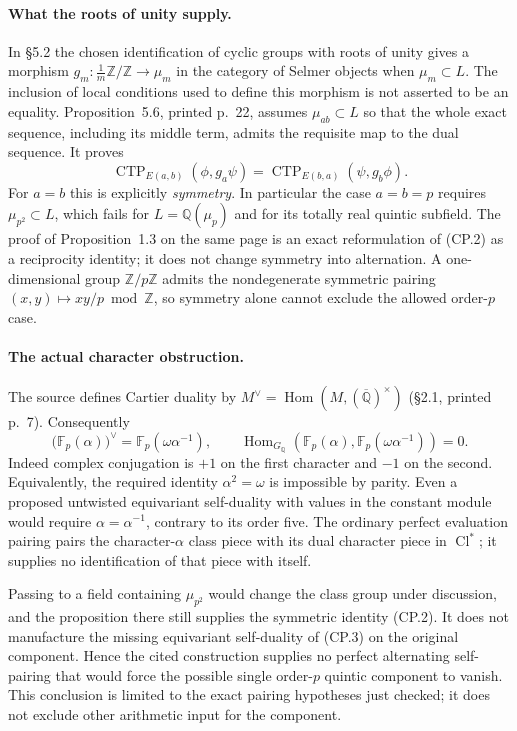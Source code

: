 \paragraph{What the roots of unity supply.}
In \S5.2 the chosen identification of cyclic groups with roots of unity
gives a morphism $g_m:\frac1m\mathbb Z/\mathbb Z\to\mu_m$ in the
category of Selmer objects when $\mu_m\subset L$.  The inclusion of local
conditions used to define this morphism is not asserted to be an equality.
Proposition~5.6, printed p.~22, assumes $\mu_{ab}\subset L$ so that the
whole exact sequence, including its middle term, admits the requisite
map to the dual sequence.  It proves
\[
 \operatorname{CTP}_{E(a,b)}(\phi,g_a\psi)
 =\operatorname{CTP}_{E(b,a)}(\psi,g_b\phi).
 \tag{CP.2}
\]
For $a=b$ this is explicitly \emph{symmetry}.  In particular the case
$a=b=p$ requires $\mu_{p^2}\subset L$, which fails for
$L=\mathbb Q(\mu_p)$ and for its totally real quintic subfield.
The proof of Proposition~1.3 on the same page is an exact reformulation
of (CP.2) as a reciprocity identity; it does not change symmetry into
alternation.  A one-dimensional group $\mathbb Z/p\mathbb Z$ admits the
nondegenerate symmetric pairing $(x,y)\mapsto xy/p\bmod\mathbb Z$, so
symmetry alone cannot exclude the allowed order-$p$ case.

\paragraph{The actual character obstruction.}
The source defines Cartier duality by
$M^\vee=\operatorname{Hom}(M,(\overline{\mathbb Q})^\times)$
(\S2.1, printed p.~7).  Consequently
\[
 \bigl(\mathbb F_p(\alpha)\bigr)^\vee
   =\mathbb F_p(\omega\alpha^{-1}),\qquad
 \operatorname{Hom}_{G_{\mathbb Q}}\!
 \left(\mathbb F_p(\alpha),
       \mathbb F_p(\omega\alpha^{-1})\right)=0.
 \tag{CP.3}
\]
Indeed complex conjugation is $+1$ on the first character and $-1$ on
the second.  Equivalently, the required identity $\alpha^2=\omega$
is impossible by parity.  Even a proposed untwisted equivariant
self-duality with values in the constant module would require
$\alpha=\alpha^{-1}$, contrary to its order five.  The ordinary
perfect evaluation pairing pairs the character-$\alpha$ class piece
with its dual character piece in $\operatorname{Cl}^{*}$; it supplies
no identification of that piece with itself.

Passing to a field containing $\mu_{p^2}$ would change the class group
under discussion, and the proposition there still supplies the symmetric
identity (CP.2).  It does not manufacture the missing equivariant
self-duality of (CP.3) on the original component.  Hence the cited
construction supplies no perfect alternating self-pairing that would
force the possible single order-$p$ quintic component to vanish.
This conclusion is limited to the exact pairing hypotheses just checked;
it does not exclude other arithmetic input for the component.


